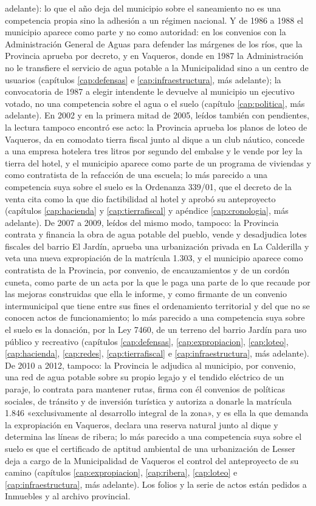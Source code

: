 adelante): lo que el año deja del municipio sobre el saneamiento no es una competencia propia sino la adhesión a un régimen nacional. Y de 1986 a 1988 el municipio aparece como parte y no como autoridad: en los convenios con la Administración General de Aguas para defender las márgenes de los ríos, que la Provincia aprueba por decreto, y en Vaqueros, donde en 1987 la Administración no le transfiere el servicio de agua potable a la Municipalidad sino a un centro de usuarios (capítulos \ref{cap:defensas} e \ref{cap:infraestructura}, más adelante); la convocatoria de 1987 a elegir intendente le devuelve al municipio un ejecutivo votado, no una competencia sobre el agua o el suelo (capítulo \ref{cap:politica}, más adelante). En 2002 y en la primera mitad de 2005, leídos también con pendientes, la lectura tampoco encontró ese acto: la Provincia aprueba los planos de loteo de Vaqueros, da en comodato tierra fiscal junto al dique a un club náutico, concede a una empresa hotelera tres litros por segundo del embalse y le vende por ley la tierra del hotel, y el municipio aparece como parte de un programa de viviendas y como contratista de la refacción de una escuela; lo más parecido a una competencia suya sobre el suelo es la Ordenanza 339/01, que el decreto de la venta cita como la que dio factibilidad al hotel y aprobó su anteproyecto (capítulos \ref{cap:hacienda} y \ref{cap:tierrafiscal} y apéndice \ref{cap:cronologia}, más adelante). De 2007 a 2009, leídos del mismo modo, tampoco: la Provincia contrata y financia la obra de agua potable del pueblo, vende y desadjudica lotes fiscales del barrio El Jardín, aprueba una urbanización privada en La Calderilla y veta una nueva expropiación de la matrícula 1.303, y el municipio aparece como contratista de la Provincia, por convenio, de encauzamientos y de un cordón cuneta, como parte de un acta por la que le paga una parte de lo que recaude por las mejoras construidas que ella le informe, y como firmante de un convenio intermunicipal que tiene entre sus fines el ordenamiento territorial y del que no se conocen actos de funcionamiento; lo más parecido a una competencia suya sobre el suelo es la donación, por la Ley 7460, de un terreno del barrio Jardín para uso público y recreativo (capítulos \ref{cap:defensas}, \ref{cap:expropiacion}, \ref{cap:loteo}, \ref{cap:hacienda}, \ref{cap:redes}, \ref{cap:tierrafiscal} e \ref{cap:infraestructura}, más adelante). De 2010 a 2012, tampoco: la Provincia le adjudica al municipio, por convenio, una red de agua potable sobre su propio legajo y el tendido eléctrico de un paraje, lo contrata para mantener rutas, firma con él convenios de políticas sociales, de tránsito y de inversión turística y autoriza a donarle la matrícula 1.846 «exclusivamente al desarrollo integral de la zona», y es ella la que demanda la expropiación en Vaqueros, declara una reserva natural junto al dique y determina las líneas de ribera; lo más parecido a una competencia suya sobre el suelo es que el certificado de aptitud ambiental de una urbanización de Lesser deja a cargo de la Municipalidad de Vaqueros el control del anteproyecto de su camino (capítulos \ref{cap:expropiacion}, \ref{cap:ribera}, \ref{cap:loteo} e \ref{cap:infraestructura}, más adelante). Los folios y la serie de actos están pedidos a Inmuebles y al archivo provincial.

